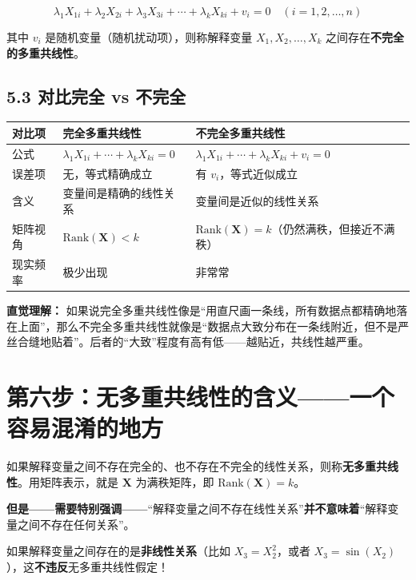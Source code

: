 \documentclass[12pt,a4paper]{ctexart}
\begin{document}
\begin{equation}
\lambda_1 X_{1i} + \lambda_2 X_{2i} + \lambda_3 X_{3i} + \cdots + \lambda_k X_{ki} + v_i = 0 \quad (i=1,2,\ldots,n) \label{eq:5}
\end{equation}

其中 $v_i$ 是随机变量（随机扰动项），则称解释变量 $X_1, X_2, \ldots, X_k$ 之间存在\textbf{不完全的多重共线性}。

\subsection*{5.3 对比完全 vs 不完全}

\begin{center}
\begin{tabular}{@{}lll@{}}
\toprule
\textbf{对比项} & \textbf{完全多重共线性} & \textbf{不完全多重共线性} \\
\midrule
公式   & $\lambda_1 X_{1i} + \cdots + \lambda_k X_{ki} = 0$ & $\lambda_1 X_{1i} + \cdots + \lambda_k X_{ki} + v_i = 0$ \\
误差项 & 无，等式精确成立 & 有 $v_i$，等式近似成立 \\
含义   & 变量间是精确的线性关系 & 变量间是近似的线性关系 \\
矩阵视角 & $\text{Rank}(\boldsymbol{X}) < k$ & $\text{Rank}(\boldsymbol{X}) = k$（仍然满秩，但接近不满秩） \\
现实频率 & 极少出现 & 非常常 \\
\bottomrule
\end{tabular}
\end{center}

\textbf{直觉理解：} 如果说完全多重共线性像是“用直尺画一条线，所有数据点都精确地落在上面”，那么不完全多重共线性就像是“数据点大致分布在一条线附近，但不是严丝合缝地贴着”。后者的“大致”程度有高有低——越贴近，共线性越严重。

\section*{第六步：无多重共线性的含义——一个容易混淆的地方}

如果解释变量之间不存在完全的、也不存在不完全的线性关系，则称\textbf{无多重共线性}。用矩阵表示，就是 $\boldsymbol{X}$ 为满秩矩阵，即 $\text{Rank}(\boldsymbol{X}) = k$。

\textbf{但是——需要特别强调——}“解释变量之间不存在线性关系”\textbf{并不意味着}“解释变量之间不存在任何关系”。

如果解释变量之间存在的是\textbf{非线性关系}（比如 $X_3 = X_2^2$，或者 $X_3 = \sin(X_2)$），这\textbf{不违反}无多重共线性假定！
\end{document}
